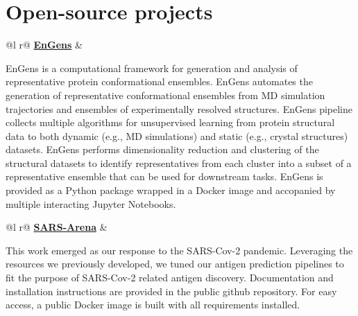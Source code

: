 \documentclass[a4paper,12pt]{article}
\begin{document}

\section{Open-source projects}

\begin{tabularx}{\linewidth}{ @{}l r@{} }
 \href{https://github.com/anon528/supreme-couscous}{\faGithub \textbf{EnGens}} &\\[3.75pt]
\begin{minipage}[t]{\linewidth}
EnGens is a computational framework for generation and analysis of representative protein conformational ensembles. EnGens automates the generation of representative conformational ensembles from MD simulation trajectories and ensembles of experimentally resolved structures. EnGens pipeline collects multiple algorithms for unsupervised learning from protein structural data to both dynamic (e.g., MD simulations) and static (e.g., crystal structures) datasets. EnGens performs dimensionality reduction and clustering of the structural datasets to identify representatives from each cluster into a subset of a representative ensemble that can be used for downstream tasks. EnGens is provided as a Python package wrapped in a Docker image and accopanied by multiple interacting Jupyter Notebooks.    
\end{minipage}
\end{tabularx}

\begin{tabularx}{\linewidth}{ @{}l r@{} }
 \href{https://github.com/KavrakiLab/SARS-Arena}{\faGithub \textbf{SARS-Arena}} &\\[3.75pt]
\begin{minipage}[t]{\linewidth}
This work emerged as our response to the SARS-Cov-2 pandemic. Leveraging the resources we previously developed, we tuned our antigen prediction pipelines to fit the purpose of SARS-Cov-2 related antigen discovery. Documentation and installation instructions are provided in the public github repository. For easy access, a public Docker image is built with all requirements installed.      
\end{minipage}
\end{tabularx}
\end{document}
